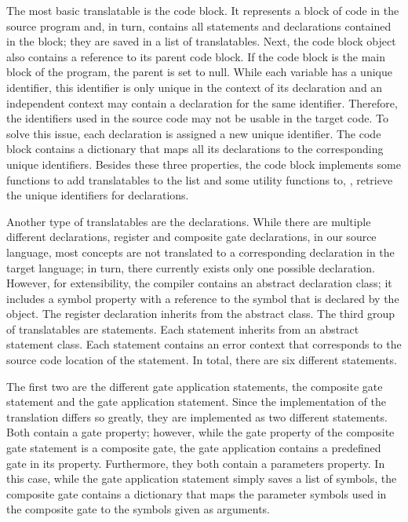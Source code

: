 The most basic translatable is the code block. It represents a block of code in the source program and, in turn, contains all statements and declarations contained in the block; they are saved in a list of translatables. Next, the code block object also contains a reference to its parent code block. If the code block is the main block of the program, the parent is set to null. While each variable has a unique identifier, this identifier is only unique in the context of its declaration and an independent context may contain a declaration for the same identifier. Therefore, the identifiers used in the source code may not be usable in the target code. To solve this issue, each declaration is assigned a new unique identifier. The code block contains a dictionary that maps all its declarations to the corresponding unique identifiers. Besides these three properties, the code block implements some functions to add translatables to the list and some utility functions to, \eg, retrieve the unique identifiers for declarations.

Another type of translatables are the declarations. While there are multiple different declarations, \eg register and composite gate declarations, in our source language, most concepts are not translated to a corresponding declaration in the target language; in turn, there currently exists only one possible declaration. However, for extensibility, the compiler contains an abstract declaration class; it includes a symbol property with a reference to the symbol that is declared by the object. The register declaration inherits from the abstract class.
The third group of translatables are statements. Each statement inherits from an abstract statement class. Each statement contains an error context that corresponds to the source code location of the statement. In total, there are six different statements. 

The first two are the different gate application statements, the composite gate statement and the gate application statement. Since the implementation of the translation differs so greatly, they are implemented as two different statements. Both contain a gate property; however, while the gate property of the composite gate statement is a composite gate, the gate application contains a predefined gate in its property. Furthermore, they both contain a parameters property. In this case, while the gate application statement simply saves a list of symbols, the composite gate contains a dictionary that maps the parameter symbols used in the composite gate to the symbols given as arguments.

